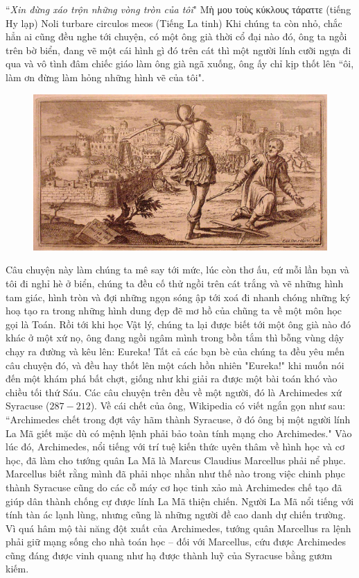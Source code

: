\begin{multicols}{2}
	``\textit{Xin đừng xáo trộn những vòng tròn của tôi}"
	\vskip 0.1cm
	\hfill Μὴ μου τοὺς κύκλους τάραττε (tiếng Hy lạp)
	\vskip 0.1cm
	\hfill Noli turbare circulos meos (Tiếng La tinh)
	\vskip 0.1cm
	Khi chúng ta còn nhỏ, chắc hẳn ai cũng đều nghe tới chuyện, có một ông già thời cổ đại nào đó, ông ta ngồi trên bờ biển, đang vẽ một cái hình gì đó trên cát thì một người lính cưỡi ngựa đi qua và vô tình đâm chiếc giáo làm ông già ngã xuống, ông ấy chỉ kịp thốt lên ``ôi, làm ơn đừng làm hỏng những hình vẽ của tôi".
	\begin{figure}[H]
		\vspace*{-5pt}
		\centering
		\captionsetup{labelformat= empty, justification=centering}
		\includegraphics[width= 1\linewidth]{1}
		\vspace*{-15pt}
	\end{figure}
	Câu chuyện này làm chúng ta mê say tới mức, lúc còn thơ ấu, cứ mỗi lần bạn và tôi đi nghỉ hè ở biển, chúng ta đều cố thử ngồi trên cát trắng và vẽ những hình tam giác, hình tròn và đợi những ngọn sóng ập tới xoá đi nhanh chóng những ký hoạ tạo ra trong những hình dung đẹp đẽ mơ hồ của chũng ta về một môn học gọi là Toán.
	\vskip 0.1cm
	Rồi tới khi học Vật lý, chúng ta lại được biết tới một ông già nào đó khác ở một xứ nọ, ông đang ngồi ngâm mình trong bồn tắm thì bỗng vùng dậy chạy ra đường và kêu lên: Eureka! Tất cả các bạn bè của chúng ta đều yêu mến câu chuyện đó, và đều hay thốt lên một cách hồn nhiên "Eureka!" khi muốn nói đến một khám phá bất chợt, giống như khi giải ra được một bài toán khó vào chiều tối thứ Sáu.
	\vskip 0.1cm
	Các câu chuyện trên đều về một người, đó là Archimedes xứ Syracuse ($287-212$). Về cái chết của ông, Wikipedia có viết ngắn gọn như sau: ``Archimedes chết trong đợt vây hãm thành Syracuse, ở đó ông bị một người lính La Mã giết mặc dù có mệnh lệnh phải bảo toàn tính mạng cho Archimedes." Vào lúc đó, Archimedes,  nổi tiếng với trí tuệ kiến thức uyên thâm về hình học và cơ học, đã làm cho tướng quân La Mã là Marcus Claudius Marcellus phải nể phục. Marcellus biết rằng mình đã phải nhọc nhằn như thế nào trong việc chinh phục thành Syracuse cũng do các cỗ máy cơ học tinh xảo mà Archimedes chế tạo đã giúp dân thành chống cự được lính La Mã thiện chiến. Người La Mã nổi tiếng với tính tàn ác lạnh lùng, nhưng cũng là những người đề cao danh dự chiến trường. Vì quá hâm mộ tài năng đột xuất của Archimedes, tướng quân Marcellus ra lệnh phải giữ mạng sống cho nhà toán học -- đối với Marcellus, cứu được Archimedes cũng đáng được  vinh quang như hạ được thành luỹ của Syracuse bằng gươm kiếm.

\end{multicols}
